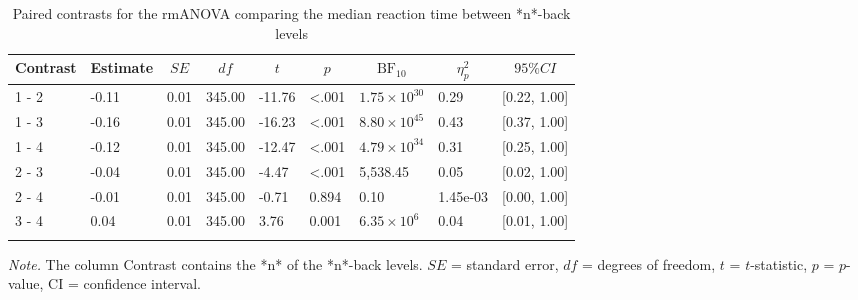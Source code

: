 \documentclass[
  man,floatsintext]{apa6}
\begin{document}
\begin{table}[H]

\begin{center}
\begin{threeparttable}

\caption{\label{tab:H1b-contrasts}Paired contrasts for the rmANOVA comparing the median reaction time between *n*-back levels}

\begin{tabular}{lllllllll}
\toprule
Contrast & \multicolumn{1}{c}{Estimate} & \multicolumn{1}{c}{$SE$} & \multicolumn{1}{c}{$df$} & \multicolumn{1}{c}{$t$} & \multicolumn{1}{c}{$p$} & \multicolumn{1}{c}{$\mathrm{BF}_{\textrm{10}}$} & \multicolumn{1}{c}{$\eta_{p}^{2}$} & \multicolumn{1}{c}{$95\% CI$}\\
\midrule
1 - 2 & -0.11 & 0.01 & 345.00 & -11.76 & <.001 & $1.75 \times 10^{30}$ & 0.29 & {}[0.22, 1.00]\\
1 - 3 & -0.16 & 0.01 & 345.00 & -16.23 & <.001 & $8.80 \times 10^{45}$ & 0.43 & {}[0.37, 1.00]\\
1 - 4 & -0.12 & 0.01 & 345.00 & -12.47 & <.001 & $4.79 \times 10^{34}$ & 0.31 & {}[0.25, 1.00]\\
2 - 3 & -0.04 & 0.01 & 345.00 & -4.47 & <.001 & 5,538.45 & 0.05 & {}[0.02, 1.00]\\
2 - 4 & -0.01 & 0.01 & 345.00 & -0.71 & 0.894 & 0.10 & 1.45e-03 & {}[0.00, 1.00]\\
3 - 4 & 0.04 & 0.01 & 345.00 & 3.76 & 0.001 & $6.35 \times 10^{6}$ & 0.04 & {}[0.01, 1.00]\\
\bottomrule
\addlinespace
\end{tabular}

\begin{tablenotes}[para]
\normalsize{\textit{Note.} The column Contrast contains the *n* of the *n*-back levels. $SE$ = standard error, $df$ = degrees of freedom, $t$ = $t$-statistic, $p$ = $p$-value, CI = confidence interval.}
\end{tablenotes}

\end{threeparttable}
\end{center}

\end{table}
\end{document}
